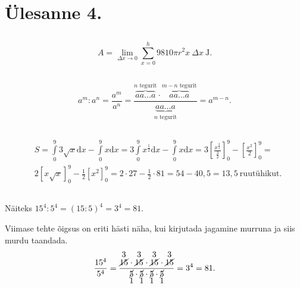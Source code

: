 \newcommand{\cOut}[2]{
\stackrel{\textstyle #2}{\cancel{#1}}
}

\newcommand{\cOutB}[2]{
\underset{\textstyle #2}{\cancel{#1}}
}

\section{Ülesanne 4.}

\subsection*{}

\begin{displaymath}
  A = \lim_{\Delta x \to 0} \sum_{x=0}^{h} 9810 \pi r^2 x \: \Delta x \: \mathrm{J}.
\end{displaymath}

\subsection*{}

\begin{displaymath}
  a^m : a^n =
  \frac{a^m}{a^n} =
  \frac{\overbrace{aa \dots a}^\text{$n$ tegurit} \cdot \overbrace{aa \dots a}^\text{$m-n$ tegurit}}
  {\underbrace{aa \dots a}_\text{$n$ tegurit}} =
  a^{m-n}.
\end{displaymath}

\subsection*{}

\begin{displaymath}
  \begin{split}
    & S = \int\limits_0^9 3\sqrt{x} \mathrm{d}x - \int\limits_0^9 x \mathrm{d}x =
    3 \int\limits_0^9 x^{\frac{1}{2}} \mathrm{d}x - \int\limits_0^9 x \mathrm{d}x =
    3\left[\frac{x^{\frac{3}{2}}}{\frac{3}{2}}\right]_0^9 - \left[\frac{x^2}{2}\right]_0^9 = \\
    & 2[x \sqrt{x}]_0^9 - \frac{1}{2} [x^2]_0^9 =
    2 \cdot 27 - \frac{1}{2} \cdot 81 = 54 - 40,5 = 13,5 \: \text{ruutühikut}.
  \end{split}
\end{displaymath}

\subsection*{}
  Näiteks $15^4 : 5^4 = (15 : 5)^4 = 3^4 = 81$.
\par
Viimase tehte õigsus on eriti hästi näha, kui kirjutada jagamine murruna ja siis murdu taandada.
\begin{displaymath}
  \frac{15^4}{5^4} = \frac{\cOut{15}{3} \cdot \cOut{15}{3} \cdot \cOut{15}{3} \cdot \cOut{15}{3}}{\cOutB{5}{1} \cdot \cOutB{5}{1} \cdot \cOutB{5}{1} \cdot \cOutB{5}{1}} = 3^4 = 81.
\end{displaymath}
